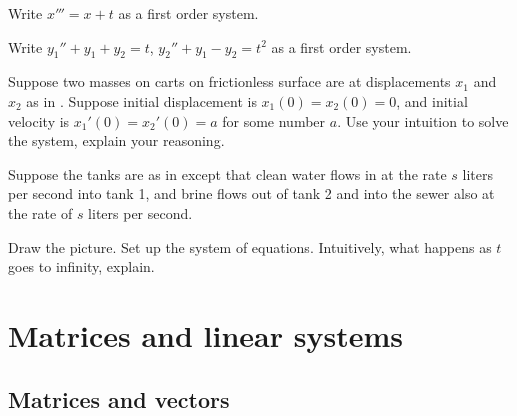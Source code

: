 \begin{exercise}
Write $x''' = x+t$ as a first order system.
\end{exercise}

\begin{exercise}
Write $y_1'' + y_1 + y_2 = t$, 
$y_2'' + y_1 - y_2 = t^2$ as a first order system.
\end{exercise}

\begin{exercise}
Suppose two masses on carts on frictionless surface are at 
displacements $x_1$ and $x_2$ as in .
Suppose initial displacement is $x_1(0)=x_2(0)=0$, and initial velocity is $x_1'(0) = x_2'(0) = a$ for some number $a$.
Use your intuition
to solve the system, explain your reasoning.
\end{exercise}

\begin{exercise}
Suppose the tanks are as in 
 except that clean water flows in
at the rate $s$ liters per second into tank 1, and brine flows out of tank 2
and into the sewer also at the rate of $s$ liters per second.
\begin{tasks}
\task Draw the picture.
\task Set up the system of equations.
\task Intuitively, what happens as $t$ goes to infinity, explain.
\end{tasks}
\end{exercise}


\sectionnewpage
\section{Matrices and linear systems} \label{sec:matrix}


\subsection{Matrices and vectors}

